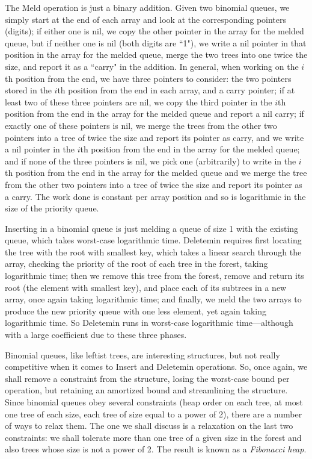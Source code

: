 \documentclass[11pt]{article}
\begin{document}
The Meld operation is just a binary addition. Given two binomial queues, we
simply start at the end of each array and look at the corresponding pointers
(digits); if either one is nil, we copy the other pointer in the array for the
melded queue, but if neither one is nil (both digits are ``1"), we write a nil
pointer in that position in the array for the melded queue, merge the two trees
into one twice the size, and report it as a ``carry" in the addition.  In
general, when working on the $i$th position from the end, we have three
pointers to consider: the two pointers stored in the $i$th position from the
end in each array, and a carry pointer; if at least two of these three pointers
are nil, we copy the third pointer in the $i$th position from the end in the
array for the melded queue and report a nil carry; if exactly one of these
pointers is nil, we merge the trees from the other two pointers into a tree of
twice the size and report its pointer as carry, and we write a nil pointer in
the $i$th position from the end in the array for the melded queue; and if none
of the three pointers is nil, we pick one (arbitrarily) to write in the $i$th
position from the end in the array for the melded queue and we merge the tree
from the other two pointers into a tree of twice the size and report its
pointer as a carry.  The work done is constant per array position and so
is logarithmic in the size of the priority queue.

Inserting in a binomial queue is just melding a queue of size 1 with
the existing queue, which takes worst-case logarithmic time.
Deletemin requires first locating the tree with the
root with smallest key, which takes a linear search through the array,
checking the priority of the root of each tree in the forest, taking
logarithmic time; then we remove this tree from the forest, remove and
return its root (the element with smallest key), and place each of its
subtrees in a new array, once again taking logarithmic time; and
finally, we meld the two arrays to produce the new priority queue with
one less element, yet again taking logarithmic time.  So Deletemin
runs in worst-case logarithmic time---although with a large coefficient
due to these three phases.

Binomial queues, like leftist trees, are interesting structures, but not
really competitive when it comes to Insert and Deletemin operations.
So, once again, we shall remove a constraint from the structure, losing
the worst-case bound per operation, but retaining an amortized bound
and streamlining the structure.  Since binomial queues obey several constraints
(heap order on each tree, at most one tree of each size, each tree of size
equal to a power of 2), there are a number of ways to relax them.  The
one we shall discuss is a relaxation on the last two constraints: we
shall tolerate more than one tree of a given size in the forest and also
trees whose size is not a power of 2.  The result is known as a \emph{Fibonacci
heap}.
\end{document}
